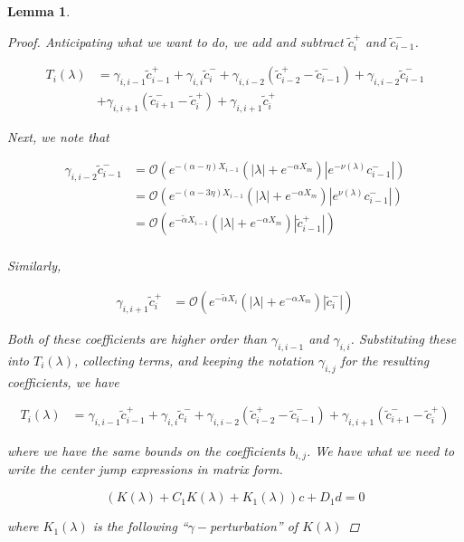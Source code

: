 \documentclass[12pt]{article}
\newtheorem{lemma}{Lemma}
\begin{document}
\begin{lemma}
\begin{proof}
Anticipating what we want to do, we add and subtract $\tilde{c}_i^+$ and $\tilde{c}_{i-1}^-$.

\begin{align*}
T_i(\lambda) &= \gamma_{i,i-1} \tilde{c}_{i-1}^+ + \gamma_{i,i} \tilde{c}_{i}^- + \gamma_{i,i-2} ( \tilde{c}_{i-2}^+ - \tilde{c}_{i-1}^-) + \gamma_{i,i-2} \tilde{c}_{i-1}^- \\
& + \gamma_{i,i+1} (\tilde{c}_{i+1}^- - \tilde{c}_i^+) + \gamma_{i,i+1} \tilde{c}_i^+
\end{align*}

Next, we note that

\begin{align*}
\gamma_{i,i-2} \tilde{c}_{i-1}^- &= \mathcal{O}(e^{-(\alpha - \eta) X_{i-1}}(|\lambda| + e^{-\alpha X_m})|e^{-\nu(\lambda)}c_{i-1}^-|) \\
&= \mathcal{O}(e^{-(\alpha - 3 \eta) X_{i-1}}(|\lambda| + e^{-\alpha X_m})|e^{\nu(\lambda)}c_{i-1}^-|) \\
&= \mathcal{O}(e^{-\tilde{\alpha} X_{i-1}}(|\lambda| + e^{-\alpha X_m})|\tilde{c}_{i-1}^+|) \\
\end{align*}

Similarly,

\begin{align*}
\gamma_{i,i+1} \tilde{c}_i^+ &= \mathcal{O}(e^{-\tilde{\alpha} X_i}(|\lambda| + e^{-\alpha X_m})|\tilde{c}_i^-|)
\end{align*}

Both of these coefficients are higher order than $\gamma_{i,i-1}$ and $\gamma_{i,i}$. Substituting these into $T_i(\lambda)$, collecting terms, and keeping the notation $\gamma_{i,j}$ for the resulting coefficients, we have

\begin{align*}
T_i(\lambda) &= \gamma_{i,i-1} \tilde{c}_{i-1}^+ + \gamma_{i,i} \tilde{c}_{i}^- + \gamma_{i,i-2} ( \tilde{c}_{i-2}^+ - \tilde{c}_{i-1}^-) + \gamma_{i,i+1} (\tilde{c}_{i+1}^- - \tilde{c}_i^+)
\end{align*}

where we have the same bounds on the coefficients $b_{i,j}$. We have what we need to write the center jump expressions in matrix form.

\[
(K(\lambda) + C_1 K(\lambda) + K_1(\lambda)) c + D_1 d = 0
\]

where $K_1(\lambda)$ is the following ``$\gamma-$perturbation'' of $K(\lambda)$ 


\end{proof}
\end{lemma}
\end{document}

